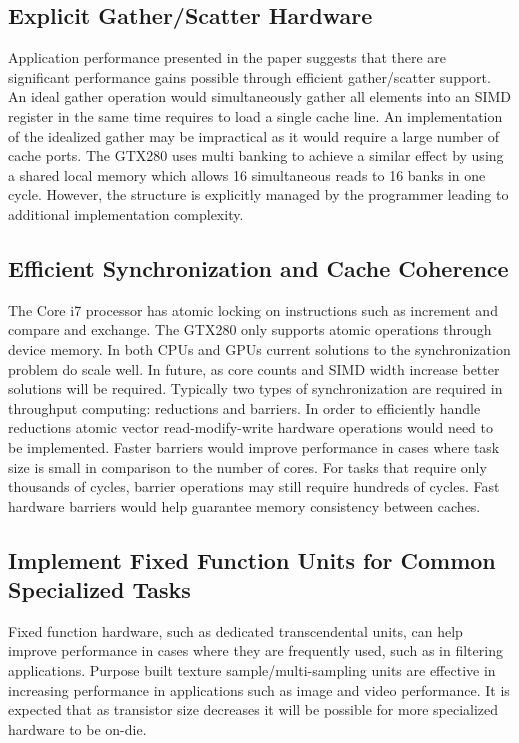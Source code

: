 \documentclass[conference]{IEEEtran}
\begin{document}
\subsection{Explicit Gather/Scatter Hardware}

Application performance presented in the paper suggests that there are significant performance gains possible through efficient gather/scatter support. An ideal gather operation would simultaneously gather all elements into an SIMD register in the same time requires to load a single cache line. An implementation of the idealized gather may be impractical as it would require a large number of cache ports. The GTX280 uses multi banking to achieve a similar effect by using a shared local memory which allows 16 simultaneous reads to 16 banks in one cycle. However, the structure is explicitly managed by the programmer leading to additional implementation complexity. 

\subsection{Efficient Synchronization and Cache Coherence}

The Core i7 processor has atomic locking on instructions such as increment and compare and exchange. The GTX280 only supports atomic operations through device memory. In both CPUs and GPUs current solutions to the synchronization problem do scale well. In future, as core counts and SIMD width increase better solutions will be required. Typically two types of synchronization are required in throughput computing: reductions and barriers. In order to efficiently handle reductions atomic vector read-modify-write hardware operations would need to be implemented. Faster barriers would improve performance in cases where task size is small in comparison to the number of cores. For tasks that require only thousands of cycles, barrier operations may still require hundreds of cycles. Fast hardware barriers would help guarantee memory consistency between caches.

\subsection{Implement Fixed Function Units for Common Specialized Tasks}

Fixed function hardware, such as dedicated transcendental units, can help improve performance in cases where they are frequently used, such as in filtering applications. Purpose built texture sample/multi-sampling units are effective in increasing performance in applications such as image and video performance. It is expected that as transistor size decreases it will be possible for more specialized hardware to be on-die.
\end{document}
